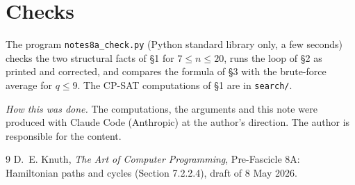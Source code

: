 \documentclass[11pt]{amsart}
\theoremstyle{remark}
\begin{document}
\section*{Checks}
The program \texttt{notes8a\_check.py} (Python standard library only, a few seconds) checks the two structural facts
of \S1 for $7\le n\le20$, runs the loop of \S2 as printed and corrected, and compares the formula of \S3 with the
brute-force average for $q\le9$. The CP-SAT computations of \S1 are in \texttt{search/}.

\medskip\noindent\emph{How this was done.} The computations, the arguments and this note were produced with Claude
Code (Anthropic) at the author's direction. The author is responsible for the content.

\begin{thebibliography}{9}
 D.~E. Knuth, \emph{The Art of Computer Programming}, Pre-Fascicle 8A: Hamiltonian paths and cycles
(Section 7.2.2.4), draft of 8 May 2026.
\end{thebibliography}
\end{document}
